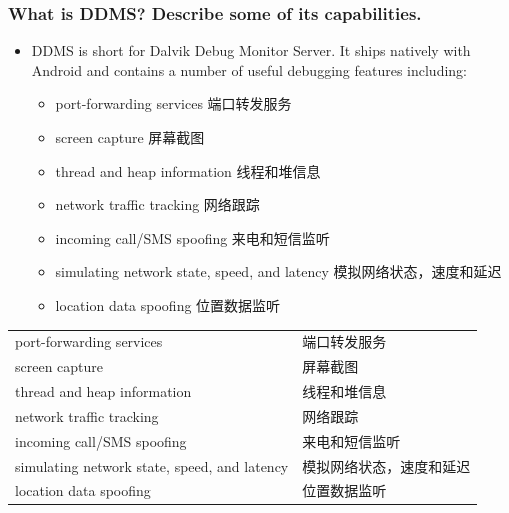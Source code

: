 \documentclass[9pt, b5paper]{article}
\begin{document}
\subsubsection{What is DDMS? Describe some of its capabilities.}
\label{sec-1-1-6}
\begin{itemize}
\item DDMS is short for Dalvik Debug Monitor Server. It ships natively with Android and contains a number of useful debugging features including: 
\begin{itemize}
\item port-forwarding services       端口转发服务
\item screen capture                 屏幕截图
\item thread and heap information    线程和堆信息
\item network traffic tracking       网络跟踪
\item incoming call/SMS spoofing     来电和短信监听
\item simulating network state, speed, and latency 模拟网络状态，速度和延迟
\item location data spoofing                       位置数据监听
\end{itemize}
\end{itemize}
\begin{center}
\begin{tabular}{ll}
\hline
port-forwarding services & 端口转发服务\\
screen capture & 屏幕截图\\
thread and heap information & 线程和堆信息\\
network traffic tracking & 网络跟踪\\
incoming call/SMS spoofing & 来电和短信监听\\
simulating network state, speed, and latency & 模拟网络状态，速度和延迟\\
location data spoofing & 位置数据监听\\
\hline
\end{tabular}
\end{center}
\end{document}

